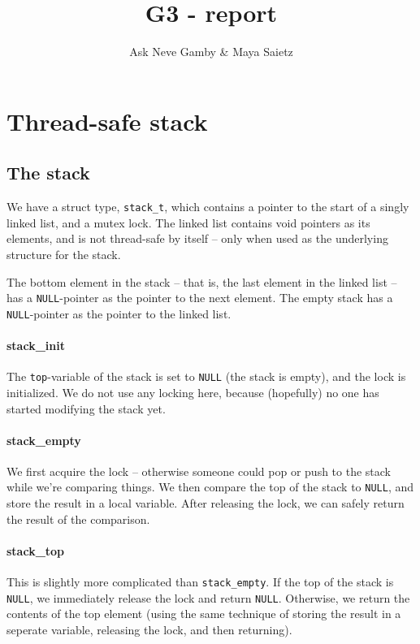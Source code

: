 \documentclass{article}
\title{G3 - report}
\author{Ask Neve Gamby \& Maya Saietz}
\begin{document}
\maketitle

\section{Thread-safe stack}
\subsection{The stack}
We have a struct type, \texttt{stack\_t}, which contains a pointer to the start of a singly linked list, and a mutex lock. The linked list contains void pointers as its elements, and is not thread-safe by itself -- only when used as the underlying structure for the stack.

The bottom element in the stack -- that is, the last element in the linked list -- has a \texttt{NULL}-pointer as the pointer to the next element. The empty stack has a \texttt{NULL}-pointer as the pointer to the linked list.

\paragraph{stack\_init}
The \texttt{top}-variable of the stack is set to \texttt{NULL} (the stack is empty), and the lock is initialized. We do not use any locking here, because (hopefully) no one has started modifying the stack yet.

\paragraph{stack\_empty} We first acquire the lock -- otherwise someone could pop or push to the stack while we're comparing things. We then compare the top of the stack to \texttt{NULL}, and store the result in a local variable. After releasing the lock, we can safely return the result of the comparison.

\paragraph{stack\_top}
This is slightly more complicated than \texttt{stack\_empty}. If the top of the stack is \texttt{NULL}, we immediately release the lock and return \texttt{NULL}. Otherwise, we return the contents of the top element (using the same technique of storing the result in a seperate variable, releasing the lock, and then returning).
\end{document}
